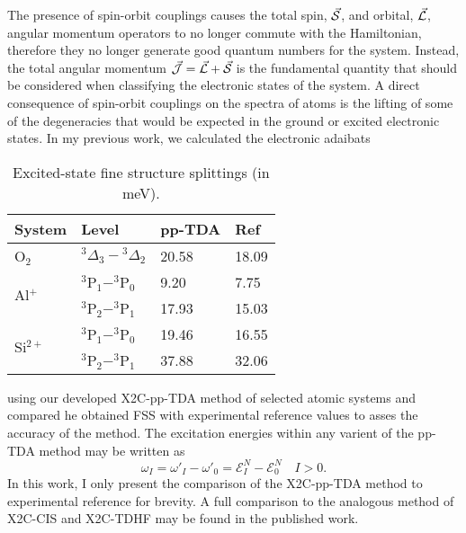 The presence of spin-orbit couplings causes the total spin, $\vec{\mathcal{S}}$, and
orbital, $\vec{\mathcal{L}}$, angular momentum operators to no longer commute with
the Hamiltonian, therefore they no longer generate good quantum numbers for the
system.  Instead, the total angular momentum
$\vec{\mathcal{J}}=\vec{\mathcal{L}}+\vec{\mathcal{S}}$ is the fundamental quantity that should
be considered when classifying the electronic states of the system.  A direct
consequence of spin-orbit couplings on the spectra of atoms is the lifting of
some of the degeneracies that would be expected in the ground or excited
electronic states.  In my previous work, we calculated the electronic adaibats
\begin{wraptable}{hr}{0.45\textwidth}
 \vspace{-0.5cm}
  \caption{\footnotesize Excited-state fine structure splittings (in meV).}
 \label{tb:DoubleEx}
 \centering
 \begin{tabular}{llll}
 System                    & Level & pp-TDA & Ref\cite{NIST_ASD,Krupenie72_423}\\
 \hline
  O$_2$ & $^3\Delta_3-{^3\Delta_2}$ & 20.58 & 18.09 \\ \hline
  \multirow{2}{*}{Al$^+$} & $^3$P$_1-^3$P$_0$ & 9.20 & 7.75 \\ 
  & $^3$P$_2-^3$P$_1$ & 17.93 & 15.03 \\  \hline
  \multirow{2}{*}{Si$^{2+}$} & $^3$P$_1-^3$P$_0$ & 19.46 & 16.55 \\ 
  & $^3$P$_2-^3$P$_1$ & 37.88 & 32.06 \\    \hline
 \end{tabular}
 \vspace{-0.5cm}
\end{wraptable}
using our developed X2C-pp-TDA method of selected atomic systems and compared he
obtained FSS with experimental reference values\cite{NIST_ASD} to asses the
accuracy of the method. The excitation energies within any varient of the pp-TDA
method may be written as
\begin{equation}
\omega_I = \omega'_I - \omega'_0 = \mathcal{E}_I^{N} - \mathcal{E}_0^N 
\quad I > 0.
\end{equation}
In this work, I only present the comparison of the X2C-pp-TDA method to
experimental reference for brevity. A full comparison to the analogous method of
X2C-CIS and X2C-TDHF may be found in the published work\cite{DBWY16_Accepted1}.

